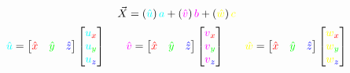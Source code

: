 \documentclass[preview]{standalone}
\begin{document}
$$\vec{X} = \left(\textcolor[HTML]{00FFFF}{\hat{u}}\right)\textcolor[HTML]{00FFFF}{a} + \left(\textcolor[HTML]{FF00FF}{\hat{v}}\right)\textcolor[HTML]{FF00FF}{b} + \left(\textcolor[HTML]{FFFF00}{\hat{w}}\right)\textcolor[HTML]{FFFF00}{c}$$
$$\begin{align*}
\textcolor[HTML]{00FFFF}{\hat{u}} = \begin{bmatrix}\textcolor[HTML]{FF0000}{\hat{x}}&\textcolor[HTML]{00FF00}{\hat{y}}&\textcolor[HTML]{0000FF}{\hat{z}}\end{bmatrix}\begin{bmatrix}\textcolor[HTML]{00FFFF}{u}_{\textcolor[HTML]{FF0000}{x}}\\\textcolor[HTML]{00FFFF}{u}_{\textcolor[HTML]{00FF00}{y}}\\\textcolor[HTML]{00FFFF}{u}_{\textcolor[HTML]{0000FF}{z}}\end{bmatrix}
&\quad&
\textcolor[HTML]{FF00FF}{\hat{v}} = \begin{bmatrix}\textcolor[HTML]{FF0000}{\hat{x}}&\textcolor[HTML]{00FF00}{\hat{y}}&\textcolor[HTML]{0000FF}{\hat{z}}\end{bmatrix}\begin{bmatrix}\textcolor[HTML]{FF00FF}{v}_{\textcolor[HTML]{FF0000}{x}}\\\textcolor[HTML]{FF00FF}{v}_{\textcolor[HTML]{00FF00}{y}}\\\textcolor[HTML]{FF00FF}{v}_{\textcolor[HTML]{0000FF}{z}}\end{bmatrix}
&\quad&
\textcolor[HTML]{FFFF00}{\hat{w}} = \begin{bmatrix}\textcolor[HTML]{FF0000}{\hat{x}}&\textcolor[HTML]{00FF00}{\hat{y}}&\textcolor[HTML]{0000FF}{\hat{z}}\end{bmatrix}\begin{bmatrix}\textcolor[HTML]{FFFF00}{w}_{\textcolor[HTML]{FF0000}{x}}\\\textcolor[HTML]{FFFF00}{w}_{\textcolor[HTML]{00FF00}{y}}\\\textcolor[HTML]{FFFF00}{w}_{\textcolor[HTML]{0000FF}{z}}\end{bmatrix}
\end{align*}$$
\end{document}
